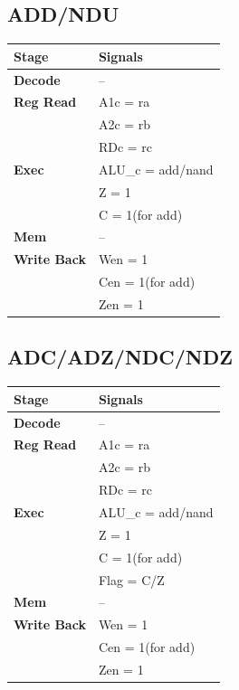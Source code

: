 \documentclass{article}
\begin{document}
\subsection*{ADD/NDU}

\begin{tabular}{|l|l|}
\hline
\textbf{Stage} & \textbf{Signals}\\
\hline
\textbf{Decode} & --\\
\hline
\textbf{Reg Read} & A1c = ra \\
                  & A2c = rb \\
                  & RDc = rc \\ 
\hline
\textbf{Exec} & ALU\_c = add/nand\\
              & Z = 1\\
              & C = 1(for add)\\  
\hline
\textbf{Mem} & --\\
\hline
\textbf{Write Back} & Wen = 1\\
                    & Cen = 1(for add)\\
                    & Zen = 1\\
\hline
\end{tabular}

\subsection*{ADC/ADZ/NDC/NDZ}
\begin{tabular}{|l|l|}
\hline
\textbf{Stage} & \textbf{Signals}\\
\hline
\textbf{Decode} & --\\
\hline
\textbf{Reg Read} & A1c = ra \\
                  & A2c = rb \\
                  & RDc = rc \\ 
\hline
\textbf{Exec} & ALU\_c = add/nand\\
              & Z = 1\\
              & C = 1(for add)\\
              & Flag = C/Z\\
\hline
\textbf{Mem} & --\\
\hline
\textbf{Write Back} & Wen = 1\\
                    & Cen = 1(for add)\\
                    & Zen = 1\\
\hline
\end{tabular}
\end{document}
